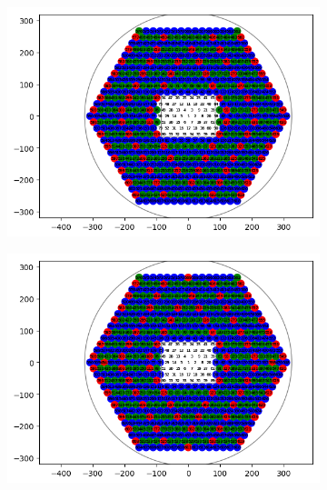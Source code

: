 \begin{figure}[h]
	\begin{center}
		\begin{subfigure}{0.85\textwidth}
			\includegraphics[width=\textwidth]{circles/sloan_adding_empty.png}
			\caption{}
		\end{subfigure}

		\begin{subfigure}{0.85\textwidth}
			\includegraphics[width=\textwidth]{circles/sloan_adding_fiducial.png}
			\caption{}
		\end{subfigure}
	\end{center}
\end{figure}
		
